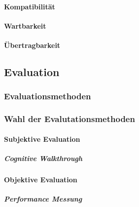 \paragraph{Kompatibilität}

\paragraph{Wartbarkeit}

\paragraph{Übertragbarkeit} 
 
\subsection{Evaluation}

\subsubsection{Evaluationsmethoden}

\subsubsection{Wahl der Evalutationsmethoden}

\paragraph{Subjektive Evaluation}

\subparagraph{Cognitive Walkthrough}

\paragraph{Objektive Evaluation}

\subparagraph{Performance Messung}